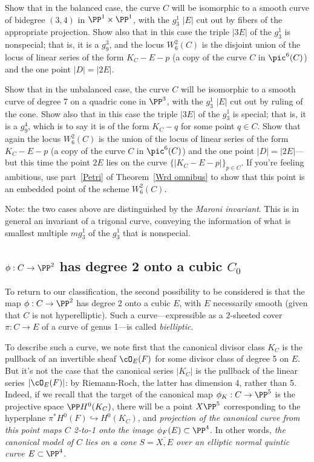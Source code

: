 \begin{exercise}
Show that in the balanced case, the curve $C$ will be isomorphic to a smooth curve of bidegree $(3,4)$ in $\PP^1 \times \PP^1$, with the $g^1_3$ $|E|$ cut out by fibers of the appropriate projection. Show also that in this case the triple $|3E|$ of the $g^1_3$ is nonspecial; that is, it is a $g^3_9$, and the locus $W^2_6(C)$ is the disjoint union of the locus of linear series of the form $K_C - E - p$ (a copy of the curve $C$ in $\pic^6(C)$) and the one point $|D| = |2E|$.
\end{exercise} 


\begin{exercise}
Show that in the unbalanced case, the curve $C$ will be isomorphic to a smooth curve of degree 7 on a quadric cone in $\PP^3$, with the $g^1_3$ $|E|$ cut out by ruling of the cone. Show also that in this case the triple $|3E|$ of the $g^1_3$ is special; that is, it is a $g^4_9$, which is to say it is of the form $K_C - q$ for some point $q \in C$. Show that again  the locus $W^2_6(C)$ is the  union of the locus of linear series of the form $K_C - E - p$ (a copy of the curve $C$ in $\pic^6(C)$) and the one point $|D| = |2E|$---but this time the point $2E$ lies on the curve $\{ |K_C - E - p| \}_{p \in C}$. If you're feeling ambitious, use part~\ref{Petri} of Theorem~\ref{Wrd omnibus} to show that this point is an embedded point of the scheme $W^2_6(C)$.
\end{exercise} 

Note: the two cases above are distinguished by the \emph{Maroni invariant}. This is in general an invariant of a trigonal curve, conveying the information of what is smallest multiple $mg^1_3$ of the $g^1_3$ that is nonspecial.

\subsection{$\phi : C \to \PP^2$ has degree 2 onto a cubic $C_0$}

To return to our classification, the second possibility to be considered is that the map $\phi : C \to \PP^2$ has degree 2 onto a cubic $E$, with $E$ necessarily smooth (given that $C$ is not hyperelliptic). Such a curve---expressible as a 2-sheeted cover $\pi : C \to E$ of a curve of genus 1---is called \emph{bielliptic}.

To describe such a curve, we note first that the canonical divisor class $K_C$ is the pullback of an invertible sheaf $\cO_E(F)$ for some divisor class of degree 5 on $E$. But it's not the case that the canonical series $|K_C|$ is the pullback of the linear series $|\cO_E(F)|$: by Riemann-Roch, the latter has dimension 4, rather than 5. Indeed, if we recall that the target of the canonical map $\phi_K : C \to \PP^5$ is the projective space $\PP H^0(K_C)$, there will be a point $X \PP^5$ corresponding to the hyperplane $\pi^*H^0(F) \hookrightarrow H^0(K_C)$, and \emph{projection of the canonical curve from this point maps $C$ 2-to-1 onto the image $\phi_F(E) \subset \PP^4$}. In other words, \emph{the canonical model of $C$ lies on a cone $S = \overline{X, E}$ over an elliptic normal quintic curve $E \subset \PP^4$}.

